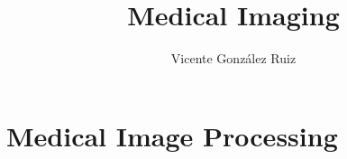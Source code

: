 \documentclass{report}
\title{Medical Imaging}
\author{Vicente González Ruiz}
\begin{document}
%
%
%
%
%
%
%
%

%
%
%
%
%
%
%
%
%

%
%
%
%

%
%

\part{Medical Image Processing}
%

%
%

\printglossary[type=\acronymtype]





\end{document}
